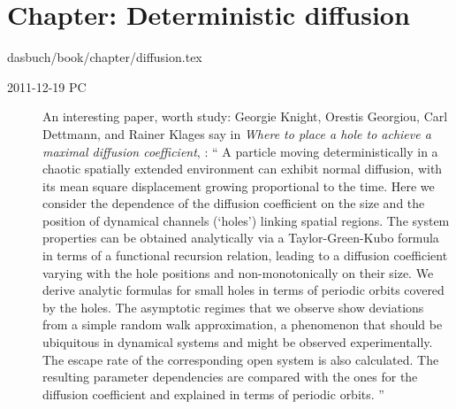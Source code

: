 \section{Chapter: Deterministic diffusion}
\label{c-diffusion}\noindent dasbuch/book/chapter/diffusion.tex
\begin{description}
\item[2011-12-19 PC] An interesting paper, worth study:
Georgie Knight, Orestis Georgiou, Carl Dettmann, and Rainer Klages say in
\emph{Where to place a hole to achieve a maximal diffusion coefficient},
 : ``
A particle moving deterministically in a chaotic spatially extended
environment can exhibit normal diffusion, with its mean square
displacement growing proportional to the time. Here we consider the
dependence of the diffusion coefficient on the size and the position of
dynamical channels (`holes') linking spatial regions. The system
properties can be obtained analytically via a Taylor-Green-Kubo formula
in terms of a functional recursion relation, leading to a diffusion
coefficient varying with the hole positions and non-monotonically on
their size. We derive analytic formulas for small holes in terms of
periodic orbits covered by the holes. The asymptotic regimes that we
observe show deviations from a simple random walk approximation, a
phenomenon that should be ubiquitous in dynamical systems and might be
observed experimentally. The escape rate of the corresponding open system
is also calculated. The resulting parameter dependencies are compared
with the ones for the diffusion coefficient and explained in terms of
periodic orbits.
''

\end{description}

